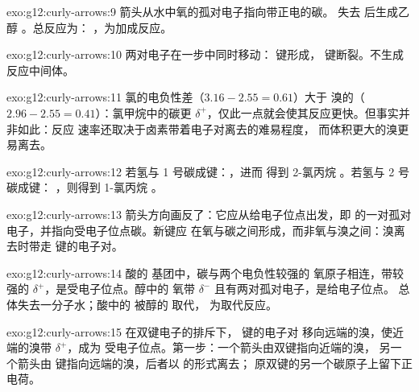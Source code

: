 \begin{solution}{exo:g12:curly-arrows:9}
箭头从水中氧的孤对电子指向带正电的碳。
失去  后生成乙醇 。总反应为：
，为加成反应。
\end{solution}

\begin{solution}{exo:g12:curly-arrows:10}
两对电子在一步中同时移动： 键形成，
键断裂。不生成反应中间体。
\end{solution}

\begin{solution}{exo:g12:curly-arrows:11}
氯的电负性差（$3.16 - 2.55 = 0.61$）大于
溴的（$2.96 - 2.55 = 0.41$）：氯甲烷中的碳更
$\delta^+$，仅此一点就会使其反应更快。但事实并非如此：反应
速率还取决于卤素带着电子对离去的难易程度，
而体积更大的溴更易离去。
\end{solution}

\begin{solution}{exo:g12:curly-arrows:12}
若氢与 1 号碳成键：，进而
得到 2-氯丙烷 。若氢与 2 号碳成键：
，则得到 1-氯丙烷 。
\end{solution}

\begin{solution}{exo:g12:curly-arrows:13}
箭头方向画反了：它应从给电子位点出发，即
 的一对孤对电子，并指向受电子位点碳。新键应
在氧与碳之间形成，而非氧与溴之间：溴离去时带走
 键的电子对。
\end{solution}

\begin{solution}{exo:g12:curly-arrows:14}
酸的  基团中，碳与两个电负性较强的
氧原子相连，带较强的 $\delta^+$，是受电子位点。醇中的
氧带 $\delta^-$ 且有两对孤对电子，是给电子位点。
总体失去一分子水；酸中的  被醇的  取代，
为取代反应。
\end{solution}

\begin{solution}{exo:g12:curly-arrows:15}
在双键电子的排斥下， 键的电子对
移向远端的溴，使近端的溴带 $\delta^+$，成为
受电子位点。第一步：一个箭头由双键指向近端的溴，
另一个箭头由  键指向远端的溴，后者以
 的形式离去；
原双键的另一个碳原子上留下正电荷。
\end{solution}

